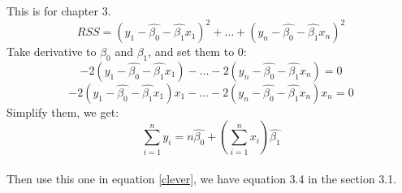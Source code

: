 \documentclass{article}
\begin{document}
This is for chapter 3. \\
\begin{equation}
RSS = (y_1 - \hat{\beta_0} - \hat{\beta_1}x_1)^2 + \dots + (y_n - \hat{\beta_0} - \hat{\beta_1}x_n)^2
\end{equation}
Take derivative to $\beta_0$ and $\beta_1$, and set them to 0:
\begin{equation}
-2(y_1 - \hat{\beta_0} - \hat{\beta_1}x_1) - \dots - 2(y_n - \hat{\beta_0} - \hat{\beta_1}x_n) = 0
\end{equation}
\begin{equation}
-2(y_1 - \hat{\beta_0} - \hat{\beta_1}x_1)x_1 - \dots - 2(y_n - \hat{\beta_0} - \hat{\beta_1}x_n)x_n = 0 \label{clever}
\end{equation}
Simplify them, we get:
\begin{equation}
\sum_{i = 1}^n y_i = n\hat{\beta_0} + (\sum_{i = 1}^n x_i) \hat{\beta_1}
\end{equation} \\
Then use this one in equation \ref{clever}, we have equation 3.4 in the section 3.1.                                                                                                     
\end{document}
